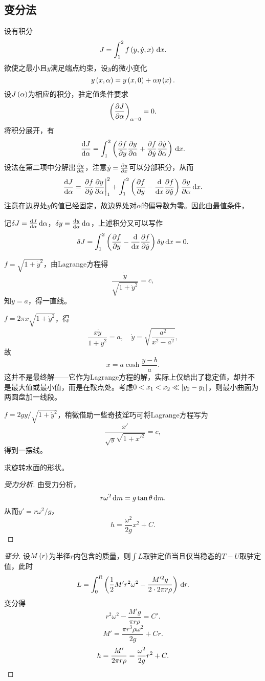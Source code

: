 \documentclass{ctexrep}
\begin{document}
\subsection{变分法}
设有积分
\[ J = \int_1^2 f\left(y,\dot{y},x\right)\, \mathrm{d} x. \]
欲使之最小且$y$满足端点约束，设$y$的微小变化
\[ y\left(x,\alpha\right) = y\left(x,0\right)+\alpha\eta\left(x\right). \]
设$J\left(\alpha\right)$为相应的积分，驻定值条件要求
\[ \left(\frac{\partial J}{\partial \alpha}\right)_{\alpha=0} = 0. \]
将积分展开，有
\[ \frac{\mathrm{d} J}{\mathrm{d} \alpha}=\int_1^2\left(\frac{\partial f}{\partial y}\frac{\partial y}{\partial \alpha}+\frac{\partial f}{\partial \dot{y}}\frac{\partial \dot{y}}{\partial \alpha}\right)\, \mathrm{d} x. \]
设法在第二项中分解出$\frac{\partial y}{\partial \alpha}$，注意$\dot{y}=\frac{\partial y}{\partial x}$可以分部积分，从而
\[ \frac{\mathrm{d} J}{\mathrm{d} \alpha} =  \left. \frac{\partial f}{\partial \dot{y}}\frac{\partial y}{\partial \alpha}\right\rvert_{1}^{2} + \int_1^2\left(\frac{\partial f}{\partial y}-\frac{\mathrm{d}}{\mathrm{d} x}\frac{\partial f}{\partial \dot{y}}\right)\frac{\partial y}{\partial \alpha}\, \mathrm{d} x.\]
注意在边界处$y$的值已经固定，故边界处对$\alpha$的偏导数为零。因此由最值条件，
\conclu{
\begin{theorem}[Lagrange方程]
  \[ \ddyon{f}-\edx\pare{\ddelon{f}{\dot{y}}}=0. \]
\end{theorem}
}
\begin{remark}
  记$\delta J = \frac{\mathrm{d} J}{\mathrm{d} \alpha}\,\mathrm{d} \alpha$，$\delta y=\frac{\mathrm{d} y}{\mathrm{d} \alpha}\,\mathrm{d} \alpha$，上述积分又可以写作
  \[ \delta J = \int_1^2 \left(\frac{\partial f}{\partial y}-\frac{\mathrm{d}}{\mathrm{d} x} \frac{\partial f}{\partial \dot{y}}\right)\delta y \, \mathrm{d} x = 0. \]
\end{remark}
\begin{ex}[两点间的最短距离]
  $f=\sqrt{1+\dot{y}^2}$，由Lagrange方程得
  \[ \frac{\dot{y}}{\sqrt{1+\dot{y}^2}}=c, \]
  知$\dot{y}=a$，得一直线。
\end{ex}
\begin{ex}[最小旋转曲面]
  $f=2\pi x\sqrt{1+\dot{y}^2}$，得
  \[ \frac{x\dot{y}}{1+\dot{y}^2}=a, \quad \dot{y}=\sqrt{\frac{a^2}{x^2-a^2}}, \]
  故
  \[ x = a\cosh \frac{y-b}{a}. \]
  这并不是最终解——它作为Lagrange方程的解，实际上仅给出了稳定值，却并不是最大值或最小值，而是在鞍点处。考虑$0<x_1<x_2\ll \abs{y_2-y_1}$，则最小曲面为两圆盘加一线段。
\end{ex}
\begin{ex}[最速降线问题]
  $f={2gy}/{\sqrt{1+\dot{y}^2}}$，稍微借助一些奇技淫巧\cite{Boas}可将Lagrange方程写为
  \[ \frac{x'}{\sqrt{y}\sqrt{1+x'^2}} = c, \]
  得到一摆线。
\end{ex}
\begin{ex}
  求旋转水面的形状。
\end{ex}
  \begin{proof}[受力分析]
    由受力分析，
    \[ r\omega^2\,\mathrm{d} m = g\tan\theta\,\mathrm{d} m. \]
    从而$y'=r\omega^2/g$，
    \[ h = \frac{\omega^2}{2g}x^2+C. \]
  \end{proof}
  \begin{proof}[变分]
    设$M\left(r\right)$为半径$r$内包含的质量，则$\int L$取驻定值当且仅当稳态的$T-U$取驻定值，此时
    \[ L = \int_0^R \left(\frac{1}{2} M' r^2\omega^2 - \frac{M'^2g}{2\cdot 2\pi r\rho}\right)\, \mathrm{d} r. \]
    变分得
    \[ r^2\omega^2 - \frac{M'g}{\pi r\rho} = C'. \]
    \[ M' = \frac{\pi r^3 \rho \omega^2}{2g} + Cr. \]
    \[ h = \frac{M'}{2\pi r \rho} = \frac{\omega^2}{2g}r^2 + C . \qedhere\]
  \end{proof}
\end{document}
